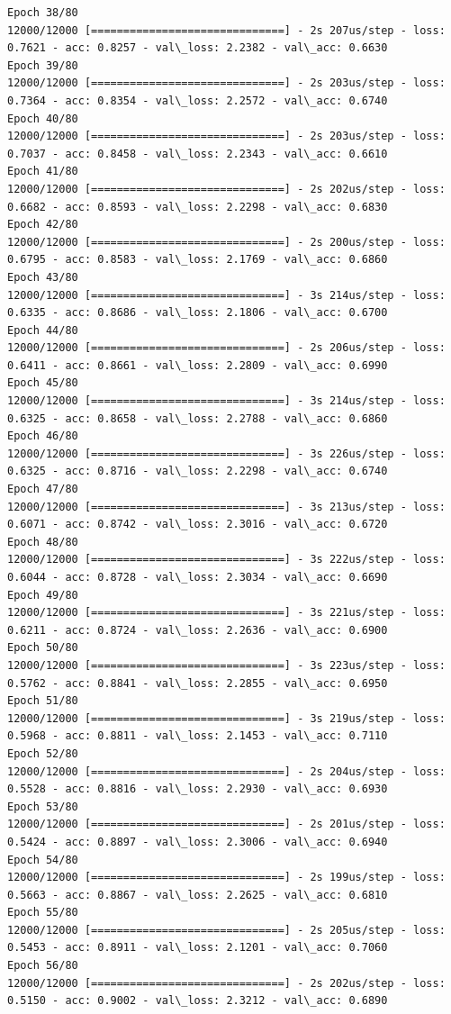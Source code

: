 \documentclass[11pt]{article}
\begin{document}
\begin{Verbatim}[commandchars=\\\{\}]
Epoch 38/80
12000/12000 [==============================] - 2s 207us/step - loss: 0.7621 - acc: 0.8257 - val\_loss: 2.2382 - val\_acc: 0.6630
Epoch 39/80
12000/12000 [==============================] - 2s 203us/step - loss: 0.7364 - acc: 0.8354 - val\_loss: 2.2572 - val\_acc: 0.6740
Epoch 40/80
12000/12000 [==============================] - 2s 203us/step - loss: 0.7037 - acc: 0.8458 - val\_loss: 2.2343 - val\_acc: 0.6610
Epoch 41/80
12000/12000 [==============================] - 2s 202us/step - loss: 0.6682 - acc: 0.8593 - val\_loss: 2.2298 - val\_acc: 0.6830
Epoch 42/80
12000/12000 [==============================] - 2s 200us/step - loss: 0.6795 - acc: 0.8583 - val\_loss: 2.1769 - val\_acc: 0.6860
Epoch 43/80
12000/12000 [==============================] - 3s 214us/step - loss: 0.6335 - acc: 0.8686 - val\_loss: 2.1806 - val\_acc: 0.6700
Epoch 44/80
12000/12000 [==============================] - 2s 206us/step - loss: 0.6411 - acc: 0.8661 - val\_loss: 2.2809 - val\_acc: 0.6990
Epoch 45/80
12000/12000 [==============================] - 3s 214us/step - loss: 0.6325 - acc: 0.8658 - val\_loss: 2.2788 - val\_acc: 0.6860
Epoch 46/80
12000/12000 [==============================] - 3s 226us/step - loss: 0.6325 - acc: 0.8716 - val\_loss: 2.2298 - val\_acc: 0.6740
Epoch 47/80
12000/12000 [==============================] - 3s 213us/step - loss: 0.6071 - acc: 0.8742 - val\_loss: 2.3016 - val\_acc: 0.6720
Epoch 48/80
12000/12000 [==============================] - 3s 222us/step - loss: 0.6044 - acc: 0.8728 - val\_loss: 2.3034 - val\_acc: 0.6690
Epoch 49/80
12000/12000 [==============================] - 3s 221us/step - loss: 0.6211 - acc: 0.8724 - val\_loss: 2.2636 - val\_acc: 0.6900
Epoch 50/80
12000/12000 [==============================] - 3s 223us/step - loss: 0.5762 - acc: 0.8841 - val\_loss: 2.2855 - val\_acc: 0.6950
Epoch 51/80
12000/12000 [==============================] - 3s 219us/step - loss: 0.5968 - acc: 0.8811 - val\_loss: 2.1453 - val\_acc: 0.7110
Epoch 52/80
12000/12000 [==============================] - 2s 204us/step - loss: 0.5528 - acc: 0.8816 - val\_loss: 2.2930 - val\_acc: 0.6930
Epoch 53/80
12000/12000 [==============================] - 2s 201us/step - loss: 0.5424 - acc: 0.8897 - val\_loss: 2.3006 - val\_acc: 0.6940
Epoch 54/80
12000/12000 [==============================] - 2s 199us/step - loss: 0.5663 - acc: 0.8867 - val\_loss: 2.2625 - val\_acc: 0.6810
Epoch 55/80
12000/12000 [==============================] - 2s 205us/step - loss: 0.5453 - acc: 0.8911 - val\_loss: 2.1201 - val\_acc: 0.7060
Epoch 56/80
12000/12000 [==============================] - 2s 202us/step - loss: 0.5150 - acc: 0.9002 - val\_loss: 2.3212 - val\_acc: 0.6890

\end{Verbatim}
\end{document}
